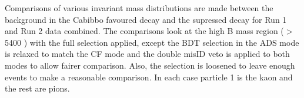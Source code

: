 %
%
%



Comparisons of various invariant mass distributions are made between the background in the Cabibbo favoured decay and the supressed decay for Run 1 and Run 2 data combined. The comparisons look at the high B mass region ($>$ 5400 \mev) with the full selection applied, except the BDT selection in the ADS mode is relaxed to match the CF mode and the double misID veto is applied to both modes to allow fairer comparison. Also, the \Kstar selection is loosened to leave enough events to make a reasonable comparison. In each case particle 1 is the kaon and the rest are pions. 

